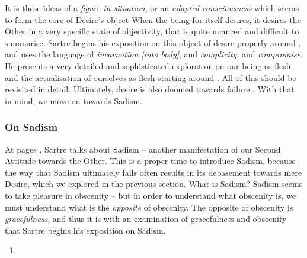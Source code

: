 \noindent
It is these ideas of a \emph{figure in situation}, or an \emph{adapted consciousness} which seems to form the core of Desire's object When the being-for-itself desires, it desires the Other in a very specific state of objectivity, that is quite nuanced and difficult to summarise. Sartre begins his exposition on this object of desire properly around \autocite[512]{sartre}, and uses the language of \emph{incarnation [into body]}, and \emph{complicity}, and \emph{compromise}. He presents a very detailed and sophisticated exploration on our being-as-flesh, and the actualisation of ourselves as flesh starting around \autocite[515]{sartre}. All of this should be revisited in detail. Ultimately, desire is also doomed towards failure \autocite[523]{sartre}. With that in mind, we move on towards Sadism.

\subsubsection{On Sadism}

At pages \autocite[526 -- 540]{sartre}, Sartre talks about Sadism -- another manifestation of our Second Attitude towards the Other. This is a proper time to introduce Sadism, because the way that Sadism ultimately fails often results in its debasement towards mere Desire, which we explored in the previous section. What is Sadism? Sadism seems to take pleasure in obscenity -- but in order to understand what obscenity is, we must understand what is the \emph{opposite} of obscenity. The opposite of obscenity is \emph{gracefulness}, and thus it is with an examination of gracefulness and obscenity \autocite[528 -- 530]{sartre} that Sartre begins his exposition on Sadism.

\begin{enumerate}
  \item {}
\end{enumerate}

